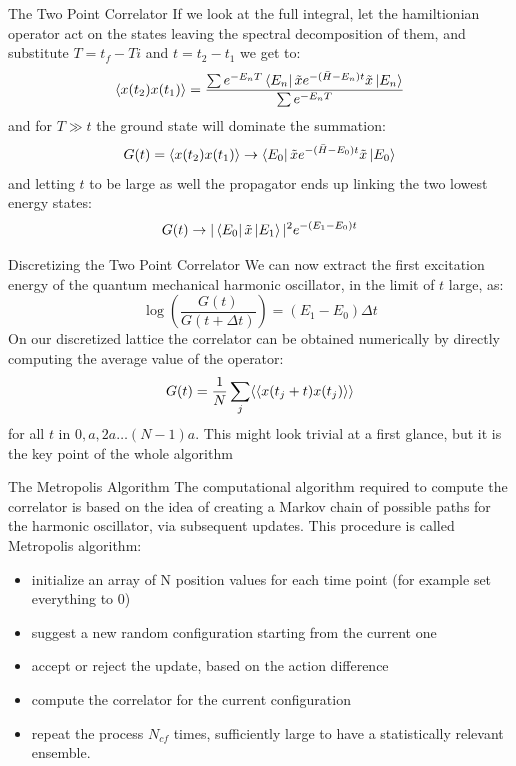 \documentclass[10pt]{beamer}
\begin{document}
\begin{frame}{The Two Point Correlator}
If we look at the full integral, let the hamiltionian operator act on the states leaving the spectral decomposition of them, and substitute $T = t_f-Ti$ and $t = t_2 - t_1$ we get to:
\[
	\langle x(t_2)x(t_1) \rangle = \frac{\sum e^{-E_n T} \bra{E_n} \tilde{x} e^{-(\bar{H}-E_n)t}  \tilde{x}\ket{E_n}}{\sum e^{-E_n T }}
\]
and for $T \gg t$ the ground state will dominate the summation:
\[
	G(t) = \langle x(t_2)x(t_1)\rangle \rightarrow  \bra{E_0} \tilde{x} e^{-(\bar{H}-E_0)t}  \tilde{x}\ket{E_0}
\]
and letting $t$ to be large as well the propagator ends up linking the two lowest energy states:
\[
	G(t) \rightarrow  |\bra{E_0} \tilde{x} \ket{E_1}|^2e^{-(E_1-E_0)t}
\]
\end{frame}

\begin{frame}{Discretizing the Two Point Correlator }
We can now extract the first excitation energy of the quantum mechanical harmonic oscillator, in the limit of $t$ large, as:
\[
	\log\left( \frac{G(t)}{G(t+\Delta t)}\right) = (E_1 - E_0)\Delta t
\]
On our discretized lattice the correlator can be obtained numerically by directly computing the average value of the operator:
\[
	G(t) = \frac{1}{N}\sum_j\langle\braket{x(t_j+t)x(t_j)}\rangle
\]
for all $t$ in $0, a, 2a\dots (N-1)a$. This might look trivial at a first glance, but it is the key point of the whole algorithm
\end{frame}

\begin{frame}{The Metropolis Algorithm}
The computational algorithm required to compute the correlator is based on the idea of creating a Markov chain of possible paths for the harmonic oscillator, via subsequent updates. This procedure is called Metropolis algorithm:
\begin{itemize}
\item initialize an array of N position values for each time point (for example set everything to 0)
\item suggest a new random configuration starting from the current one
\item accept or reject the update, based on the action difference
\item compute the correlator for the current configuration
\item repeat the process $N_{cf}$ times, sufficiently large to have a statistically relevant ensemble.
\end{itemize}
\end{frame}
\end{document}
